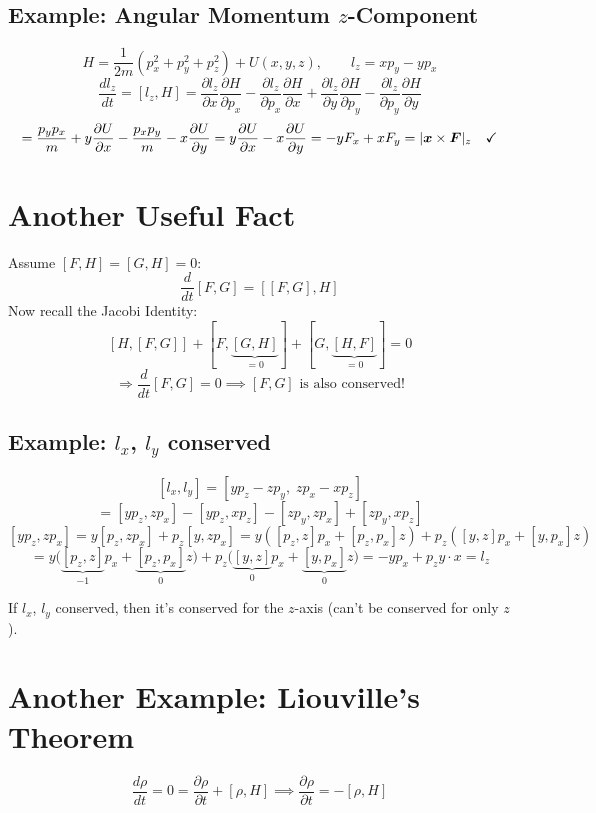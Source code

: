 \subsection*{Example: Angular Momentum $z$-Component}

\[
    H = \frac{1}{2m}(p_x^2 + p_y^2 + p_z^2) + U(x,y,z), \qquad l_z = xp_y - yp_x
\]
\[
    \frac{dl_z}{dt} = [l_z, H] = \frac{\partial l_z}{\partial x}\frac{\partial H}{\partial p_x} - \frac{\partial l_z}{\partial p_x}\frac{\partial H}{\partial x} + \frac{\partial l_z}{\partial y}\frac{\partial H}{\partial p_y} - \frac{\partial l_z}{\partial p_y}\frac{\partial H}{\partial y}
\]
\[
    = \frac{p_y p_x}{m} + y\frac{\partial U}{\partial x} - \frac{p_x p_y}{m} - x\frac{\partial U}{\partial y}
    = y\frac{\partial U}{\partial x} - x\frac{\partial U}{\partial y} = -yF_x + xF_y = |\lvect{x}\times\vect{F}|_z \quad \checkmark
\]

\section{Another Useful Fact}

Assume $[F,H] = [G,H] = 0$:
\[
    \frac{d}{dt}[F,G] = [[F,G], H]
\]
Now recall the Jacobi Identity:
\[
    [H,[F,G]] + [F,\underbrace{[G,H]}_{=0}] + [G,\underbrace{[H,F]}_{=0}] = 0
\]
\[
    \Rightarrow \frac{d}{dt}[F,G] = 0 \implies [F,G] \text{ is also conserved!}
\]

\subsection*{Example: $l_x$, $l_y$ conserved}

\[
    [l_x, l_y] = [yp_z - zp_y,\; zp_x - xp_z]
\]
\[
    = [yp_z, zp_x] - [yp_z, xp_z] - [zp_y, zp_x] + [zp_y, xp_z]
\]
\[
    [yp_z, zp_x] = y[p_z, zp_x] + p_z[y, zp_x] = y\!\left([p_z, z]p_x + [p_z, p_x]z\right) + p_z\!\left([y,z]p_x + [y,p_x]z\right)
\]
\[
    = y\bigl(\underbrace{[p_z, z]}_{-1}p_x + \underbrace{[p_z, p_x]}_{0}z\bigr) + p_z\bigl(\underbrace{[y,z]}_{0}p_x + \underbrace{[y,p_x]}_{0}z\bigr) = -yp_x + p_z y \cdot x = l_z
\]

If $l_x$, $l_y$ conserved, then it's conserved for the $z$-axis (can't be conserved for only $z$).

\section{Another Example: Liouville's Theorem}

\[
    \frac{d\rho}{dt} = 0 = \frac{\partial\rho}{\partial t} + [\rho, H] \implies \frac{\partial\rho}{\partial t} = -[\rho, H]
\]

